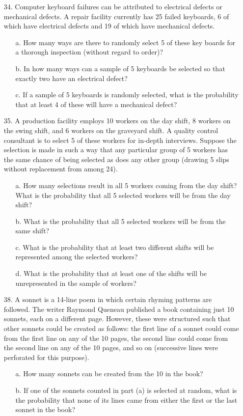 \documentclass[letterpaper,12pt]{article}
\begin{document}
\begin{enumerate}
\begin{enumerate}
    \end{enumerate}
  \item[34.]
    Computer keyboard failures can be attributed to electrical defects or mechanical defects. A repair facility currently has 25 failed keyboards, 6 of which have electrical defects and 19 of which have mechanical defects.
    \begin{enumerate}
      \item[a.]
        How many ways are there to randomly select 5 of these key boards for a thorough inspection (without regard to order)?
      \item[b.]
        In how many ways can a sample of 5 keyboards be selected so that exactly two have an electrical defect?
      \item[c.]
        If a sample of 5 keyboards is randomly selected, what is the probability that at least 4 of these will have a mechanical defect?
    \end{enumerate}
  \item[35.]
    A production facility employs 10 workers on the day shift, 8 workers on the swing shift, and 6 workers on the graveyard shift. A quality control consultant is to select 5 of these workers for in-depth interviews. Suppose the selection is made in such a way that any particular group of 5 workers has the same chance of being selected as does any other group (drawing 5 slips without replacement from among 24).
    \begin{enumerate}
      \item[a.]
        How many selections result in all 5 workers coming from the day shift? What is the probability that all 5 selected workers will be from the day shift?
      \item[b.]
        What is the probability that all 5 selected workers will be from the same shift?
      \item[c.]
        What is the probability that at least two different shifts will be represented among the selected workers?
      \item[d.]
        What is the probability that at least one of the shifts will be unrepresented in the sample of workers?
    \end{enumerate}
  \item[38.]
    A sonnet is a 14-line poem in which certain rhyming patterns are followed. The writer Raymond Queneau published a book containing just 10 sonnets, each on a different page. However, these were structured such that other sonnets could be created as follows: the first line of a sonnet could come from the first line on any of the 10 pages, the second line could come from the second line on any of the 10 pages, and so on (successive lines were perforated for this purpose).
    \begin{enumerate}
        \item[a.]
          How many sonnets can be created from the 10 in the book?
        \item[b.]
          If one of the sonnets counted in part (a) is selected at random, what is the probability that none of its lines came from either the first or the last sonnet in the book?
      \end{enumerate}
\end{enumerate}
\end{document}
